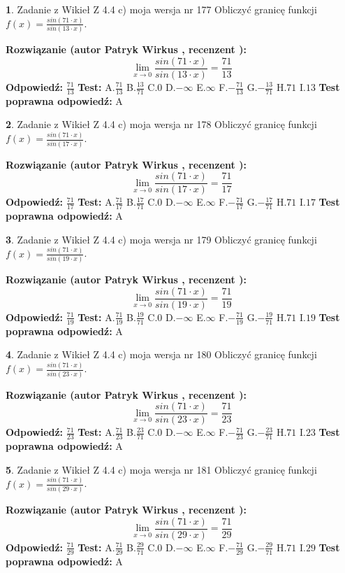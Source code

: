 \documentclass[12pt, a4paper]{article}
\theoremstyle{definition} %
\newtheorem{zad}{}
\newcommand{\zadStart}[1]{\begin{zad}#1\newline}
\newcommand{\zadStop}{\end{zad}}
\newcommand{\rozwStart}[2]{\noindent \textbf{Rozwiązanie (autor #1 , recenzent #2): }\newline}
\newcommand{\rozwStop}{\newline}
\newcommand{\odpStart}{\noindent \textbf{Odpowiedź:}\newline}
\newcommand{\odpStop}{\newline}
\newcommand{\testStart}{\noindent \textbf{Test:}\newline}
\newcommand{\testStop}{\newline}
\newcommand{\kluczStart}{\noindent \textbf{Test poprawna odpowiedź:}\newline}
\newcommand{\kluczStop}{\newline}
\begin{document}
\zadStart{Zadanie z Wikieł Z 4.4 c) moja wersja nr 177}
Obliczyć granicę funkcji $f(x)=\frac{sin(71\cdot x)}{sin(13\cdot x)}$.
\zadStop
\rozwStart{Patryk Wirkus}{}
$$\lim\limits_{x\to 0}\frac{sin(71\cdot x)}{sin(13\cdot x)}=
\frac{71}{13}$$
\rozwStop
\odpStart
$\frac{71}{13}$
\odpStop
\testStart
A.$\frac{71}{13}$
B.$\frac{13}{71}$
C.$0$
D.$-\infty$
E.$\infty$
F.$-\frac{71}{13}$
G.$-\frac{13}{71}$
H.$71$
I.$13$
\testStop
\kluczStart
A
\kluczStop



\zadStart{Zadanie z Wikieł Z 4.4 c) moja wersja nr 178}
Obliczyć granicę funkcji $f(x)=\frac{sin(71\cdot x)}{sin(17\cdot x)}$.
\zadStop
\rozwStart{Patryk Wirkus}{}
$$\lim\limits_{x\to 0}\frac{sin(71\cdot x)}{sin(17\cdot x)}=
\frac{71}{17}$$
\rozwStop
\odpStart
$\frac{71}{17}$
\odpStop
\testStart
A.$\frac{71}{17}$
B.$\frac{17}{71}$
C.$0$
D.$-\infty$
E.$\infty$
F.$-\frac{71}{17}$
G.$-\frac{17}{71}$
H.$71$
I.$17$
\testStop
\kluczStart
A
\kluczStop



\zadStart{Zadanie z Wikieł Z 4.4 c) moja wersja nr 179}
Obliczyć granicę funkcji $f(x)=\frac{sin(71\cdot x)}{sin(19\cdot x)}$.
\zadStop
\rozwStart{Patryk Wirkus}{}
$$\lim\limits_{x\to 0}\frac{sin(71\cdot x)}{sin(19\cdot x)}=
\frac{71}{19}$$
\rozwStop
\odpStart
$\frac{71}{19}$
\odpStop
\testStart
A.$\frac{71}{19}$
B.$\frac{19}{71}$
C.$0$
D.$-\infty$
E.$\infty$
F.$-\frac{71}{19}$
G.$-\frac{19}{71}$
H.$71$
I.$19$
\testStop
\kluczStart
A
\kluczStop



\zadStart{Zadanie z Wikieł Z 4.4 c) moja wersja nr 180}
Obliczyć granicę funkcji $f(x)=\frac{sin(71\cdot x)}{sin(23\cdot x)}$.
\zadStop
\rozwStart{Patryk Wirkus}{}
$$\lim\limits_{x\to 0}\frac{sin(71\cdot x)}{sin(23\cdot x)}=
\frac{71}{23}$$
\rozwStop
\odpStart
$\frac{71}{23}$
\odpStop
\testStart
A.$\frac{71}{23}$
B.$\frac{23}{71}$
C.$0$
D.$-\infty$
E.$\infty$
F.$-\frac{71}{23}$
G.$-\frac{23}{71}$
H.$71$
I.$23$
\testStop
\kluczStart
A
\kluczStop



\zadStart{Zadanie z Wikieł Z 4.4 c) moja wersja nr 181}
Obliczyć granicę funkcji $f(x)=\frac{sin(71\cdot x)}{sin(29\cdot x)}$.
\zadStop
\rozwStart{Patryk Wirkus}{}
$$\lim\limits_{x\to 0}\frac{sin(71\cdot x)}{sin(29\cdot x)}=
\frac{71}{29}$$
\rozwStop
\odpStart
$\frac{71}{29}$
\odpStop
\testStart
A.$\frac{71}{29}$
B.$\frac{29}{71}$
C.$0$
D.$-\infty$
E.$\infty$
F.$-\frac{71}{29}$
G.$-\frac{29}{71}$
H.$71$
I.$29$
\testStop
\kluczStart
A
\kluczStop
\end{document}
